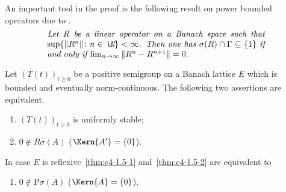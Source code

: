 An important tool in the proof is the following result on power bounded operators due to \textcite{katznelsontzafriri:1984}.
\begin{equation}\label{eq:c4-1.4}
\begin{minipage}{.75\linewidth}
\textit{Let $R$ be a linear operator on a Banach space such that $\sup\{ \|R^{n}\| \colon n \in \N \} < \infty$. 
Then one has $\sigma(R) \cap \Gamma \subseteq \{1\}$ if and only if 
$ \lim_{n \to \infty} \|R^{n} - R^{n+1}\| = 0$.}
\end{minipage}
\end{equation}
\begin{theorem}\label{thm:c4-1.5}%
Let $(T(t))_{t\geq 0}$ be a positive semigroup on a Banach lattice $E$ which is bounded and eventually norm-continuous.
The following two assertions are equivalent.
\begin{enumerate}[\upshape (a)]
    \item \label{thm:c4-1.5-1}
    $(T(t))_{t\geq 0}$ is uniformly stable;
    
    \item \label{thm:c4-1.5-2}
    $0 \notin R\sigma(A)$ (\ie  $\Kern{A'} 
    = \{0\}$).
\end{enumerate}
In case $E$ is reflexive~\ref{thm:c4-1.5-1} and~\ref{thm:c4-1.5-2} are equivalent to
\begin{enumerate}

\item  \label{thm:c4-1.5-3}
$0 \notin \text{P}\sigma(A)$ (\ie  $\Kern{A} = \{0\}$).
\end{enumerate}
\end{theorem}
